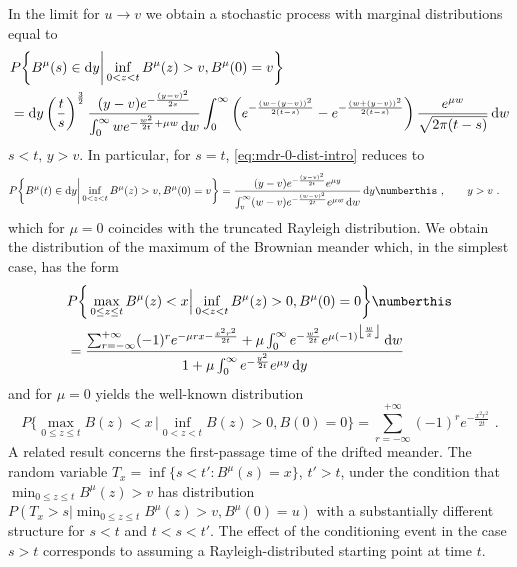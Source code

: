 In the limit for $ u \to v $ we obtain a stochastic process with marginal distributions equal to 
%
%
%
\begin{align}\label{eq:mdr-0-dist-intro}
&
P \bigg\{  
B^\mu ( s) \in \mathrm d y \bigg |  \inf_{ 0 < z < t } B^\mu( z)  > v, B^\mu(0) = v  
\bigg \} \\
&=
\mathrm d y \left(\frac ts \right)^{\frac 32} 
\frac{
	(y - v) e^{  -\frac{(y-v)^2}{2s}  }
}{
	\int_0^{\infty} w  e^{  - \frac { w^2 } { 2t } + \mu w } \,\mathrm d w 
}
\int_0^\infty  \left( e^{ - \frac{(w-(y-v) )^2}{2 ( t-s)}}  - e^{ - \frac{(w + (y - v ) )^2}{2 ( t-s)}}  \right)
	\frac{e^{\mu w }}{\sqrt{2 \pi( t-s)}} \, \mathrm d w \notag 
\end{align}
$ s < t, \, y > v $. In particular, for $ s = t $, \eqref{eq:mdr-0-dist-intro} reduces to 
%
%
\begin{align*}
&
P \bigg\{  
B^\mu ( t) \in \mathrm d y \bigg |  \inf_{ 0 < z < t } B^\mu( z)  > v, B^\mu(0) = v  
\bigg \} 
=
\frac{
	(y - v )   e^{  - \frac{ (y-v)^2}{2t} } e^{\mu y } 
}{
	\int_v^\infty (w-v) e^{  - \frac{ (w-v)^2}{2t}   }  e^{ \mu w} \, \mathrm d w
} \,\mathrm d y 
\numberthis \label{eq:bmd-drift-dist-t-intro} \,\, , \qquad y > v\,\, .
\end{align*}
%
%
which for $ \mu = 0 $ coincides with the truncated Rayleigh distribution. 
We obtain the distribution of the maximum of the Brownian meander which, in the simplest case, has the form
%
\begin{align*}
&
P\bigg\{ \max_{0 \leq z \leq t} B^\mu(z) <x \Big |  \inf_{0 < z < t} B^\mu (z) > 0, B^\mu(0) = 0  \bigg\}
\label{eq:max-bmd-t-v0-fin-intro}
\numberthis
\\
&=
\frac{  
	\sum_{r = -\infty} ^ { + \infty}
	(-1)^r
	e^{  -  \mu r x - \frac{x^2 r^2}{2t}  } 
	+ \mu
	\int_0^\infty e^{ - \frac{w^2}{2t} } e^{ \mu (-1)^{ \left \lfloor \frac w x \right \rfloor} } \,\mathrm d w
}{
	1 + \mu \int_0^\infty 
	e^{  - \frac{y^2}{2t}  } 
	e^{ \mu y } \,\mathrm d y	
}
\end{align*}
%
%
and for $  \mu = 0 $  yields the well-known distribution 
\begin{equation}\label{eq:max-bmd-mu0-intro}
P\bigg\{ \max_{0 \leq z \leq t} B(z) <x \, \Big |  \inf_{0 < z < t} B (z) > 0, B(0) = 0  \bigg\}
=
\sum_{r = - \infty} ^ { + \infty} 
(-1)^r
e^{  - \frac{x^2 r^2 }{2t}  } \,\, .
\end{equation}
%
%
A related result concerns the first-passage time of the drifted meander. The random variable 
$ T_x = \inf \{ s < t' : B^\mu(s) = x  \} $, $ t'> t $, under the condition that $ \min_{ 0 \leq z \leq t } B^\mu (z) > v $ 
has distribution $ P(T_x > s | \min_{ 0 \leq z \leq t } B^\mu (z) > v, B^\mu(0) = u) $ with a substantially 
different structure for $ s < t  $ and $ t < s < t' $. The effect of the conditioning event in the case $ s > t $ 
corresponds to assuming a Rayleigh-distributed starting point at time $ t $.  

